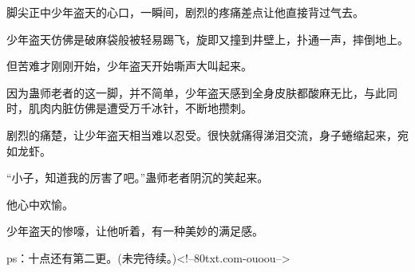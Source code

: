 \begin{this_body}
脚尖正中少年盗天的心口，一瞬间，剧烈的疼痛差点让他直接背过气去。

少年盗天仿佛是破麻袋般被轻易踢飞，旋即又撞到井壁上，扑通一声，摔倒地上。

但苦难才刚刚开始，少年盗天开始嘶声大叫起来。

因为蛊师老者的这一脚，并不简单，少年盗天感到全身皮肤都酸麻无比，与此同时，肌肉内脏仿佛是遭受万千冰针，不断地攒刺。

剧烈的痛楚，让少年盗天相当难以忍受。很快就痛得涕泪交流，身子蜷缩起来，宛如龙虾。

“小子，知道我的厉害了吧。”蛊师老者阴沉的笑起来。

他心中欢愉。

少年盗天的惨嚎，让他听着，有一种美妙的满足感。

ps：十点还有第二更。(未完待续。)<!--80txt.com-ouoou-->

\end{this_body}

